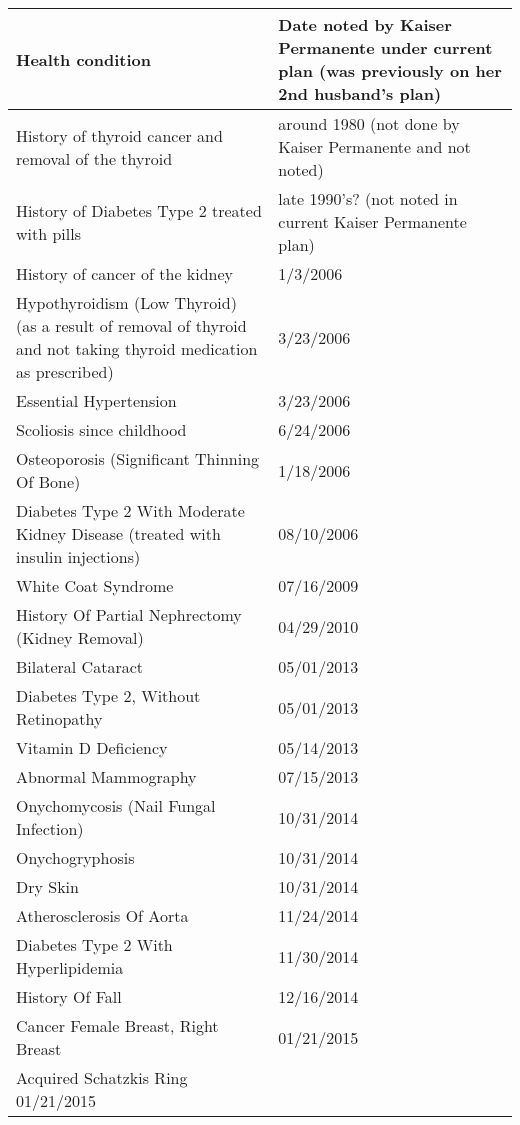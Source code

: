 \documentclass[]{article}
\newcommand{\sw}{.15\textwidth}
\newcommand{\bw}{.39\textwidth}
\begin{document}
\begin{tabular}{|p{\bw}|p{\sw}|}
	\hline
	Health condition & Date noted by Kaiser Permanente under current plan (was previously on her 2nd husband's plan)\\ \hline
	History of thyroid cancer and removal of the thyroid & around 1980 (not done by Kaiser Permanente and not noted)\\ \hline
	History of Diabetes Type 2 treated with pills & late 1990's? (not noted in current Kaiser Permanente plan)\\ \hline
	History of cancer of the kidney & 1/3/2006\\ \hline
	Hypothyroidism (Low Thyroid) (as a result of removal of thyroid and not taking thyroid medication as prescribed) & 3/23/2006\\ \hline
	Essential Hypertension & 3/23/2006\\ \hline
	Scoliosis since childhood & 6/24/2006\\ \hline
	Osteoporosis (Significant Thinning Of Bone) & 1/18/2006\\ \hline
	Diabetes Type 2 With Moderate Kidney Disease (treated with insulin injections) & 08/10/2006\\ \hline
	White Coat Syndrome & 07/16/2009\\ \hline
	History Of Partial Nephrectomy (Kidney Removal) & 04/29/2010\\ \hline
	Bilateral Cataract & 05/01/2013\\ \hline
	Diabetes Type 2, Without Retinopathy & 05/01/2013\\ \hline
	Vitamin D Deficiency & 05/14/2013\\ \hline
	Abnormal Mammography & 07/15/2013\\ \hline
	Onychomycosis (Nail Fungal Infection) & 10/31/2014\\ \hline
	Onychogryphosis & 10/31/2014\\ \hline
	Dry Skin & 10/31/2014\\ \hline
	Atherosclerosis Of Aorta & 11/24/2014\\ \hline
	Diabetes Type 2 With Hyperlipidemia & 11/30/2014\\ \hline
	History Of Fall & 12/16/2014\\ \hline
	Cancer Female Breast, Right Breast & 01/21/2015\\ \hline
	Acquired Schatzkis Ring	01/21/2015\\
	\hline
\end{tabular}
\end{document}
